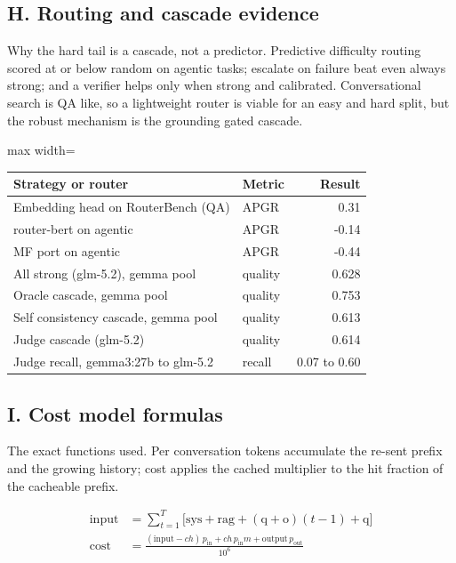 \documentclass[11pt]{uce-report}
\begin{document}
\subsection{H. Routing and cascade evidence}
Why the hard tail is a cascade, not a predictor. Predictive difficulty routing scored at or below random on agentic tasks; escalate on failure beat even always strong; and a verifier helps only when strong and calibrated. Conversational search is QA like, so a lightweight router is viable for an easy and hard split, but the robust mechanism is the grounding gated cascade.


\vspace{0.4em}
\noindent\begin{adjustbox}{max width=\linewidth}\begin{tabular}{p{6cm}p{4.5cm}r}
\toprule
\textbf{Strategy or router} & \textbf{Metric} & \textbf{Result} \\
\midrule
Embedding head on RouterBench (QA) & APGR & 0.31 \\
router-bert on agentic & APGR & -0.14 \\
MF port on agentic & APGR & -0.44 \\
All strong (glm-5.2), gemma pool & quality & 0.628 \\
Oracle cascade, gemma pool & quality & 0.753 \\
Self consistency cascade, gemma pool & quality & 0.613 \\
Judge cascade (glm-5.2) & quality & 0.614 \\
Judge recall, gemma3:27b to glm-5.2 & recall & 0.07 to 0.60 \\
\bottomrule
\end{tabular}\end{adjustbox}

\subsection{I. Cost model formulas}
The exact functions used. Per conversation tokens accumulate the re-sent prefix and the growing history; cost applies the cached multiplier to the hit fraction of the cacheable prefix.


\[
\begin{aligned}
\text{input} &= \sum_{t=1}^{T}\Big[\text{sys} + \text{rag} + (\text{q}+\text{o})(t-1) + \text{q}\Big] \\[2pt]
\text{cost} &= \frac{(\text{input} - c h)\,p_{\text{in}} + c h\,p_{\text{in}} m + \text{output}\,p_{\text{out}}}{10^{6}}
\end{aligned}
\]
\end{document}
